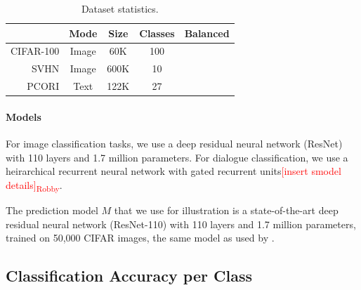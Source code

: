 \documentclass{article}
\newcommand{\cmark}{\ding{51}}%
\newcommand{\xmark}{\ding{55}}%
\newcommand{\robby}[1]{\textcolor{Red}{[#1]\textsubscript{Robby}}}
\begin{document}
\begin{table}[t]
    \centering
    \begin{tabular}{rcccc}
        \toprule
                        & Mode  & Size  & Classes   & Balanced  \\
        \midrule
             CIFAR-100  & Image & 60K   & 100       & \cmark    \\
             SVHN       & Image & 600K  & 10        & \cmark    \\
             PCORI      & Text  & 122K  & 27        & \xmark    \\
        \bottomrule
    \end{tabular}
    \caption{Dataset statistics.}
    \label{tab:datasets}
\end{table}

\paragraph{Models}
For image classification tasks, we use a deep residual neural network (ResNet)~\cite{he2016deep} with 110 layers and 1.7 million parameters.
For dialogue classification, we use a heirarchical recurrent neural network with gated recurrent units\robby{insert smodel details}.


The prediction model $M$ that we use for illustration is a state-of-the-art deep residual neural network   (ResNet-110) with 110 layers and 1.7 million parameters, trained on 50,000 CIFAR images, the same model as used by \cite{guo2017calibration}.


\subsection{Classification Accuracy per Class}
\end{document}
